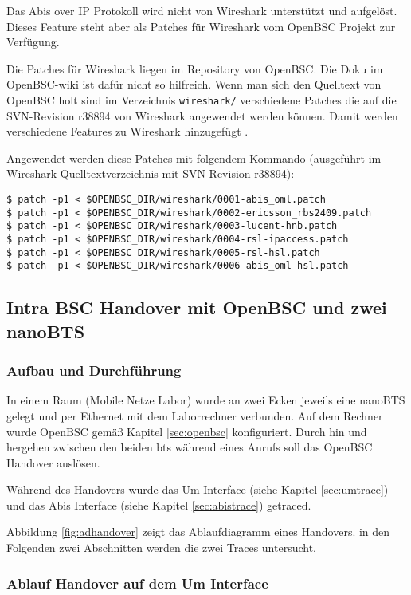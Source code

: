 Das Abis over IP Protokoll wird nicht von Wireshark unterstützt und aufgelöst. Dieses Feature steht aber als Patches für Wireshark vom OpenBSC Projekt zur Verfügung.

Die Patches für Wireshark liegen im Repository von OpenBSC. Die Doku im OpenBSC-wiki ist dafür nicht so hilfreich. Wenn man sich den Quelltext von OpenBSC holt sind im Verzeichnis \lstinline{wireshark/} verschiedene Patches die auf die SVN-Revision r38894 von Wireshark angewendet werden können. Damit werden verschiedene Features zu Wireshark hinzugefügt \cite{bib:wiresharkabis, bib:wiresharkabisreadme}.

Angewendet werden diese Patches mit folgendem Kommando (ausgeführt im Wireshark Quelltextverzeichnis mit SVN Revision r38894):
\begin{lstlisting}[caption={Patchen von Wireshark}]
$ patch -p1 < $OPENBSC_DIR/wireshark/0001-abis_oml.patch
$ patch -p1 < $OPENBSC_DIR/wireshark/0002-ericsson_rbs2409.patch
$ patch -p1 < $OPENBSC_DIR/wireshark/0003-lucent-hnb.patch
$ patch -p1 < $OPENBSC_DIR/wireshark/0004-rsl-ipaccess.patch
$ patch -p1 < $OPENBSC_DIR/wireshark/0005-rsl-hsl.patch
$ patch -p1 < $OPENBSC_DIR/wireshark/0006-abis_oml-hsl.patch 
\end{lstlisting}

\subsection{Intra BSC Handover mit OpenBSC und zwei nanoBTS}

\subsubsection{Aufbau und Durchführung}
In einem Raum (Mobile Netze Labor) wurde an zwei Ecken jeweils eine nanoBTS gelegt und per Ethernet mit dem Laborrechner verbunden. Auf dem Rechner wurde OpenBSC gemäß Kapitel \ref{sec:openbsc} konfiguriert. Durch hin und hergehen zwischen den beiden \gls{bts} während eines Anrufs soll das OpenBSC Handover auslösen.

Während des Handovers wurde das Um Interface (siehe Kapitel \ref{sec:umtrace}) und das Abis Interface (siehe Kapitel \ref{sec:abistrace}) getraced.

Abbildung \ref{fig:adhandover} zeigt das Ablaufdiagramm eines Handovers. in den Folgenden zwei Abschnitten werden die zwei Traces untersucht. 

\subsubsection{Ablauf Handover auf dem Um Interface}\label{sec:obsc-um}

